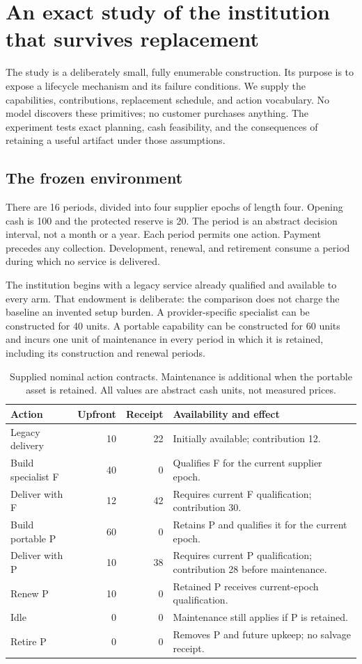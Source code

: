 \section{An exact study of the institution that survives replacement}
\label{sec:study}
The study is a deliberately small, fully enumerable construction. Its purpose is to expose a lifecycle mechanism and its failure conditions. We supply the capabilities, contributions, replacement schedule, and action vocabulary. No model discovers these primitives; no customer purchases anything. The experiment tests exact planning, cash feasibility, and the consequences of retaining a useful artifact under those assumptions.

\subsection{The frozen environment}
There are 16 periods, divided into four supplier epochs of length four. Opening cash is 100 and the protected reserve is 20. The period is an abstract decision interval, not a month or a year. Each period permits one action. Payment precedes any collection. Development, renewal, and retirement consume a period during which no service is delivered.

The institution begins with a legacy service already qualified and available to every arm. That endowment is deliberate: the comparison does not charge the baseline an invented setup burden. A provider-specific specialist can be constructed for 40 units. A portable capability can be constructed for 60 units and incurs one unit of maintenance in every period in which it is retained, including its construction and renewal periods.

\begin{table}[htbp]
\centering\small
\caption{Supplied nominal action contracts. Maintenance is additional when the portable asset is retained. All values are abstract cash units, not measured prices.}
\begin{tabularx}{\textwidth}{@{}lrrX@{}}
\toprule
Action & Upfront & Receipt & Availability and effect\\
\midrule
Legacy delivery & 10 & 22 & Initially available; contribution 12.\\
Build specialist F & 40 & 0 & Qualifies F for the current supplier epoch.\\
Deliver with F & 12 & 42 & Requires current F qualification; contribution 30.\\
Build portable P & 60 & 0 & Retains P and qualifies it for the current epoch.\\
Deliver with P & 10 & 38 & Requires current P qualification; contribution 28 before maintenance.\\
Renew P & 10 & 0 & Retained P receives current-epoch qualification.\\
Idle & 0 & 0 & Maintenance still applies if P is retained.\\
Retire P & 0 & 0 & Removes P and future upkeep; no salvage receipt.\\
\bottomrule
\end{tabularx}
\end{table}

